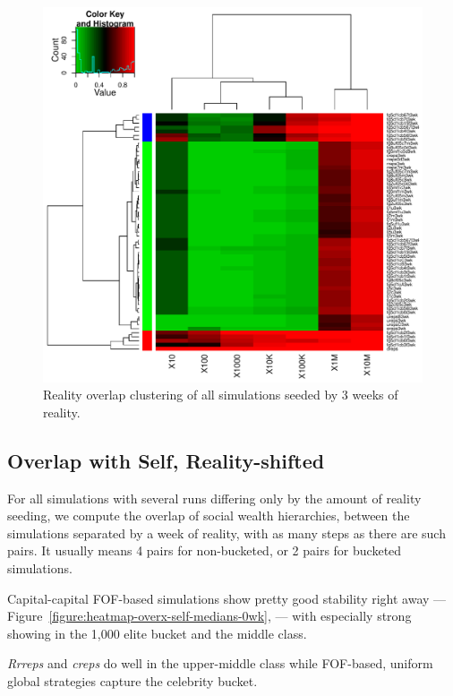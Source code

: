\documentclass[10pt,oneside]{memoir}
\begin{document}
\begin{Spacing}{2}
\begin{figure}
\begin{center}
    \includegraphics{figures/crop/heatmap-overx-dreps-medians-3wk}
    \caption{Reality overlap clustering of all simulations seeded by 3 weeks of reality.}
    \label{figure:heatmap-overx-dreps-medians-3wk}
\end{center}
\end{figure}
\pagebreak \subsection{Overlap with Self, Reality-shifted}
\label{overlapwithselfreality-shifted}

For all simulations with several runs differing only by the amount of reality seeding, we compute the overlap of social wealth hierarchies, between the simulations separated by a week of reality, with as many steps as there are such pairs.  It usually means 4 pairs for non-bucketed, or 2 pairs for bucketed simulations.


Capital-capital FOF-based simulations show pretty good stability right away --- Figure~\ref{figure:heatmap-overx-self-medians-0wk}, --- with especially strong showing in the 1,000 elite bucket and the middle class.


{\itshape Rrreps} and {\itshape creps} do well in the upper-middle class while FOF-based, uniform global strategies capture the celebrity bucket.



\end{Spacing}
\end{document}
